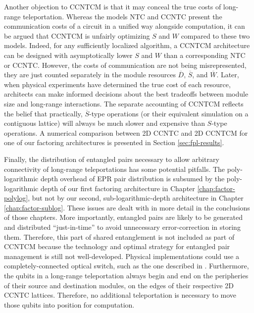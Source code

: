Another objection to \textsf{CCNTCM} is that it may conceal the true
costs of long-range teleportation. Whereas the models \textsf{NTC} and
\textsf{CCNTC} present the communication costs of a circuit in a unified
way alongside computation, it can be argued that \textsf{CCNTCM} is unfairly
optimizing $S$ and $W$ compared to these two models. Indeed, for any
sufficiently localized algorithm, a \textsf{CCNTCM} architecture can be designed with asymptotically lower $S$ and $W$ than a corresponding \textsf{NTC} or \textsf{CCNTC}. However, the costs of communication are not being
misrepresented, they are just counted separately
in the module resources $\overline{D}$, $\overline{S}$, and
$\overline{W}$. Later, when physical experiments have determined the
true cost of each resource, architects can make informed decisions about
the best tradeoffs between module size and long-range interactions.
The separate accounting of \textsf{CCNTCM} reflects the belief that
practically, $\overline{S}$-type operations (or their equivalent simulation
on a contiguous lattice) will always be much slower
and expensive than $S$-type operations. A numerical comparison between
\textsf{2D CCNTC} and \textsf{2D CCNTCM} for one of our
factoring architectures is presented in Section \ref{sec:fpl-results}.

Finally, the distribution of entangled pairs necessary to allow
arbitrary connectivity of long-range teleportations has some
potential pitfalls. The poly-logarithmic depth overhead
of EPR pair distribution is subsumed by the poly-logarithmic
depth of our first factoring architecture in
Chapter \ref{chap:factor-polylog}, but not by our
second, sub-logarithmic-depth architecture in
Chapter \ref{chap:factor-sublog}. These issues are
dealt with in more detail in the conclusions of those chapters.
More importantly, entangled pairs are likely to be generated
and distributed ``just-in-time'' to avoid unnecessary
error-correction in storing them.
Therefore, this part of shared entanglement is not included as part
of \textsf{CCNTCM} because
the technology and optimal strategy for entangled pair management
is still not well-developed.
Physical implementations could use a completely-connected
optical switch, such as the one described in \cite{Monroe2012}.
Furthermore, the qubits in a long-range teleportation always begin and end
on the peripheries of their source and destination modules,
on the edges of their respective \textsf{2D CCNTC} lattices.
Therefore, no additional teleportation is necessary to move
those qubits into position for computation.

